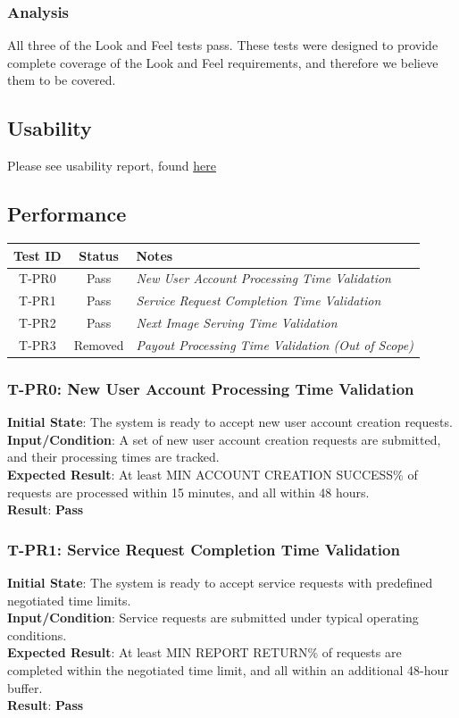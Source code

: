\documentclass[12pt, titlepage]{article}
\begin{document}
    \subsubsection{Analysis}
    All three of the Look and Feel tests pass. These tests were designed to provide complete coverage of the Look and Feel requirements, and therefore we believe them to be covered.
\subsection{Usability}
	Please see usability report, found \href{https://github.com/OKKM-insights/OKKM.insights/blob/main/docs/Extras/UsabilityReport/UsabilityReport.pdf}{here}

\subsection{Performance}
\begin{longtable}{|c|c|l|}
    \hline
    \textbf{Test ID} & \textbf{Status} & \textbf{Notes} \\
    \hline
    T-PR0 & Pass & \textit{New User Account Processing Time Validation} \\
    T-PR1 & Pass & \textit{Service Request Completion Time Validation} \\
    T-PR2 & Pass & \textit{Next Image Serving Time Validation} \\
    T-PR3 & Removed & \textit{Payout Processing Time Validation (Out of Scope)} \\
    \hline
\end{longtable}

\subsubsection{T-PR0: New User Account Processing Time Validation}
\textbf{Initial State}: The system is ready to accept new user account creation requests.\\
\textbf{Input/Condition}: A set of new user account creation requests are submitted, and their processing times are tracked.\\
\textbf{Expected Result}: At least MIN ACCOUNT CREATION SUCCESS\% of requests are processed within 15 minutes, and all within 48 hours.\\
\textbf{Result}: \textbf{Pass}

\subsubsection{T-PR1: Service Request Completion Time Validation}
\textbf{Initial State}: The system is ready to accept service requests with predefined negotiated time limits.\\
\textbf{Input/Condition}: Service requests are submitted under typical operating conditions.\\
\textbf{Expected Result}: At least MIN REPORT RETURN\% of requests are completed within the negotiated time limit, and all within an additional 48-hour buffer.\\
\textbf{Result}: \textbf{Pass}
\end{document}
